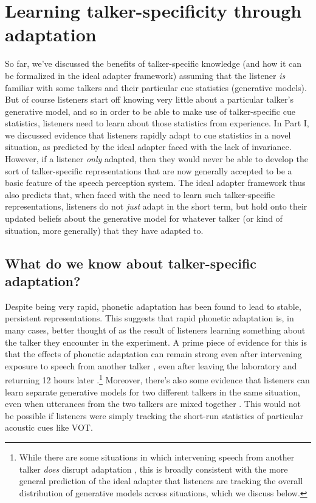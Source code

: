 \section{Learning talker-specificity through adaptation}
\label{sec:learn-talk-spec}

So far, we've discussed the benefits of talker-specific knowledge (and how it can be formalized in the ideal adapter framework) assuming that the listener \emph{is} familiar with some talkers and their particular cue statistics (generative models).  But of course listeners start off knowing very little about a particular talker's generative model, and so in order to be able to make use of talker-specific cue statistics, listeners need to learn about those statistics from experience.  In Part I, we discussed evidence that listeners rapidly adapt to cue statistics in a novel situation, as predicted by the ideal adapter faced with the lack of invariance.  However, if a listener \emph{only} adapted, then they would never be able to develop the sort of talker-specific representations that are now generally accepted to be a basic feature of the speech perception system.  The ideal adapter framework thus also predicts that, when faced with the need to learn such talker-specific representations, listeners do not \emph{just} adapt in the short term, but hold onto their updated beliefs about the generative model for whatever talker (or kind of situation, more generally) that they have adapted to.  

\subsection{What do we know about talker-specific adaptation?}
\label{sec:what-do-we-know-talker-adapt}

Despite being very rapid, phonetic adaptation has been found to lead to stable, persistent representations.  This suggests that rapid phonetic adaptation is, in many cases, better thought of as the result of listeners learning something about the talker they encounter in the experiment.  A prime piece of evidence for this is that the effects of phonetic adaptation can remain strong even after intervening exposure to speech from another talker \autocite{Kraljic2005,Kraljic2007}, even after leaving the laboratory and returning 12 hours later \autocite{Eisner2006}.\footnote{While there are some situations in which intervening speech from another talker \emph{does} disrupt adaptation \autocite[e.g. the \ph d-\ph t condition in][]{Kraljic2007}, this is broadly consistent with the more general prediction of the ideal adapter that listeners are tracking the overall distribution of generative models across situations, which we discuss below.}  Moreover, there's also some evidence that listeners can learn separate generative models for two different talkers in the same situation, even when utterances from the two talkers are mixed together \autocite{Munson2011}.  This would not be possible if listeners were simply tracking the short-run statistics of particular acoustic cues like VOT.

